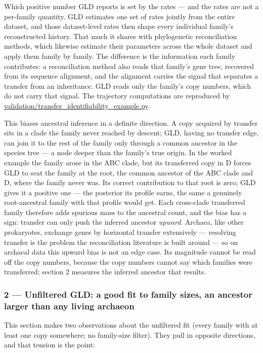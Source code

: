 \documentclass[
  10pt,
]{article}
\begin{document}
Which positive number GLD reports is set by the rates --- and the rates
are not a per-family quantity. GLD estimates one set of rates jointly
from the entire dataset, and those dataset-level rates then shape every
individual family's reconstructed history. That much it shares with
phylogenetic reconciliation methods, which likewise estimate their
parameters across the whole dataset and apply them family by family. The
difference is the information each family contributes: a reconciliation
method also reads that family's gene tree, recovered from its sequence
alignment, and the alignment carries the signal that separates a
transfer from an inheritance. GLD reads only the family's copy numbers,
which do not carry that signal. The trajectory computations are
reproduced by \url{validation/transfer_identifiability_example.py}.

This biases ancestral inference in a definite direction. A copy acquired
by transfer sits in a clade the family never reached by descent; GLD,
having no transfer edge, can join it to the rest of the family only
through a common ancestor in the species tree --- a node deeper than the
family's true origin. In the worked example the family arose in the ABC
clade, but its transferred copy in D forces GLD to seat the family at
the root, the common ancestor of the ABC clade and D, where the family
never was. Its correct contribution to that root is zero; GLD gives it a
positive one --- the posterior its profile earns, the same a genuinely
root-ancestral family with that profile would get. Each cross-clade
transferred family therefore adds spurious mass to the ancestral count,
and the bias has a sign: transfer can only push the inferred ancestor
\emph{upward}. Archaea, like other prokaryotes, exchange genes by
horizontal transfer extensively --- resolving transfer is the problem
the reconciliation literature is built around --- so on archaeal data
this upward bias is not an edge case. Its magnitude cannot be read off
the copy numbers, because the copy numbers cannot say which families
were transferred; section 2 measures the inferred ancestor that results.

\subsubsection{2 --- Unfiltered GLD: a good fit to family sizes, an
ancestor larger than any living
archaeon}\label{2--unfiltered-gld-a-good-fit-to-family-sizes-an-ancestor-larger-than-any-living-archaeon}

This section makes two observations about the unfiltered fit (every
family with at least one copy somewhere; no family-size filter). They
pull in opposite directions, and that tension is the point:
\end{document}
